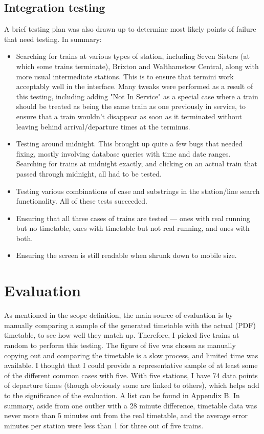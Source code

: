 \documentclass[a4paper,12pt,twoside]{report}
\begin{document}
\subsection{Integration testing}

A brief testing plan was also drawn up to determine most likely points of
failure that need testing. In summary:

\begin{itemize}
  \item Searching for trains at various types of station, including Seven
    Sisters (at which some trains terminate), Brixton and Walthamstow Central,
    along with more usual intermediate stations. This is to ensure that termini
    work acceptably well in the interface. Many tweaks were performed as a
    result of this testing, including adding "Not In Service" as a special case
    where a train should be treated as being the same train as one previously
    in service, to ensure that a train wouldn't disappear as soon as it
    terminated without leaving behind arrival/departure times at the terminus.
  \item Testing around midnight. This brought up quite a few bugs that needed
    fixing, mostly involving database queries with time and date ranges.
    Searching for trains at midnight exactly, and clicking on an actual train
    that passed through midnight, all had to be tested.
  \item Testing various combinations of case and substrings in the station/line
    search functionality. All of these tests succeeded.
  \item Ensuring that all three cases of trains are tested --- ones with real
    running but no timetable, ones with timetable but not real running, and
    ones with both.
  \item Ensuring the screen is still readable when shrunk down to mobile size.
\end{itemize}

\section{Evaluation}

As mentioned in the scope definition, the main source of evaluation is by
manually comparing a sample of the generated timetable with the actual (PDF)
timetable, to see how well they match up. Therefore, I picked five trains at
random to perform this testing. The figure of five was chosen as manually
copying out and comparing the timetable is a slow process, and limited time was
available. I thought that I could provide a representative sample of at least
some of the different common cases with five. With five stations, I have 74
data points of departure times (though obviously some are linked to others),
which helps add to the significance of the evaluation. A list can be found in
Appendix B. In summary, aside from one outlier with a 28 minute difference,
timetable data was never more than 5 minutes out from the real timetable, and
the average error minutes per station were less than 1 for three out of five
trains.
\end{document}
